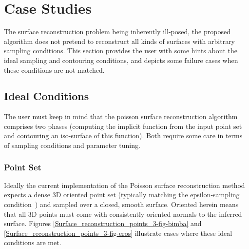 \section{Case Studies}
\label{surface_reconstruction_section_case_studies}

The surface reconstruction problem being inherently ill-posed, the proposed algorithm does not pretend to reconstruct all kinds of surfaces with arbitrary sampling conditions. This section provides the user with some hints about the ideal sampling and contouring conditions, and depicts some failure cases when these conditions are not matched.

\subsection{Ideal Conditions}

The user must keep in mind that the poisson surface reconstruction algorithm comprises two phases (computing the implicit function from the input point set and contouring an iso-surface of this function). Both require some care in terms of sampling conditions and parameter tuning.

\subsubsection{Point Set}

Ideally the current implementation of the Poisson surface reconstruction method expects a dense 3D oriented point set (typically matching the epsilon-sampling condition~\cite{cgal:bo-pgsms-05}) and sampled over a closed, smooth surface. Oriented herein means that all 3D points must come with consistently oriented normals to the inferred surface. Figures \ref{Surface_reconstruction_points_3-fig-bimba} and \ref{Surface_reconstruction_points_3-fig-eros} illustrate cases where these ideal conditions are met.

